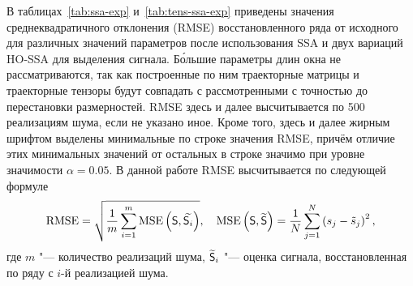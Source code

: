 \documentclass[specialist,
    substylefile = spbu.rtx,
    subf,href,colorlinks=true, 12pt]{disser}
\theoremstyle{plain}
\theoremstyle{definition}
\theoremstyle{remark}
\begin{document}
    В таблицах~\ref{tab:ssa-exp} и~\ref{tab:tens-ssa-exp} приведены значения среднеквадратичного отклонения
    (RMSE) восстановленного ряда от исходного
    для различных значений параметров после использования SSA и двух вариаций HO-SSA для выделения сигнала\@.
    Б\'{о}льшие параметры длин окна не рассматриваются, так как построенные по ним траекторные матрицы и траекторные 
    тензоры будут совпадать с рассмотренными с точностью до перестановки размерностей.
    RMSE здесь и далее высчитывается по 500 реализациям шума, если не указано иное.
    Кроме того, здесь и далее жирным шрифтом выделены минимальные по строке значения RMSE, причём
    отличие этих минимальных значений от остальных в строке значимо при уровне значимости $\alpha = 0.05$.
    В данной работе RMSE высчитывается по следующей формуле
    \begin{equation*}
        \text{RMSE} = \sqrt{\frac{1}{m} \sum_{i=1}^{m} \text{MSE}\left(\mathsf{S}, \widetilde{\mathsf{S}_i}\right)},
        \quad \text{MSE}\left(\mathsf{S}, \widetilde{\mathsf{S}} \right) = \frac{1}{N} \sum_{j=1}^{N}\left(s_j - \tilde{s}_j\right)^2,
    \end{equation*}
    где $m$ "--- количество реализаций шума, $\widetilde{\mathsf{S}}_i$ "--- оценка сигнала,
    восстановленная по ряду с $i$-й реализацией шума.
\end{document}
